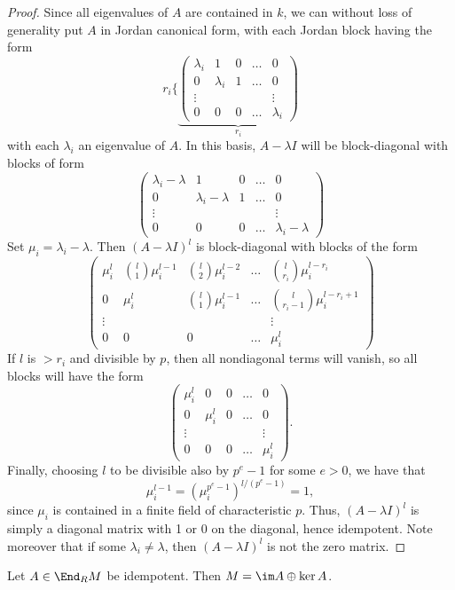 \documentclass{article}
\let\l\lambda
\numberwithin{equation}{section}
\theoremstyle{theorem}
\numberwithin{thm}{section}
\theoremstyle{definition}
\begin{document}
\begin{proof}
Since all eigenvalues of $A$ are contained in $k$, we can without loss of generality put $A$ in Jordan canonical form, with each Jordan block having the form
$$
r_i\Biggl\{
\underbrace{\begin{pmatrix}
\l_i & 1 & 0 &\dots & 0
\\
0& \l_i & 1  &\dots & 0
\\
\vdots & &&&\vdots
\\
0& 0 & 0  &\dots & \l_i
\end{pmatrix}}_{r_i}
$$
with each $\l_i$ an eigenvalue of $A$.
In this basis, $A-\l I$ will be block-diagonal with blocks of form
$$
\begin{pmatrix}
\l_i-\l & 1 & 0 &\dots & 0
\\
0& \l_i-\l & 1  &\dots & 0
\\
\vdots & &&&\vdots
\\
0& 0 & 0  &\dots & \l_i-\l
\end{pmatrix}
$$
Set $\mu_i=\l_i-\l$. Then $(A-\l I)^l$ is block-diagonal with blocks of the form
$$
\begin{pmatrix}
\mu_i^l & \binom{l}1\mu_i^{l-1} & \binom{l}2\mu_i^{l-2} &\dots & \binom{l}{r_i}\mu_i^{l-r_i}
\\
0& \mu_i^l &
\binom{l}1\mu_i^{l-1}  &\dots & \binom{l}{r_i-1}\mu_i^{l-r_i+1}
\\
\vdots & &&&\vdots
\\
0& 0 & 0  &\dots & \mu_i^l
\end{pmatrix}
$$
If $l$ is $> r_i$ and divisible by $p$, then all nondiagonal terms will vanish, so all blocks will have the form
$$
\begin{pmatrix}
\mu_i^l & 0 & 0 &\dots & 0
\\
0& \mu_i^l & 0  &\dots & 0
\\
\vdots & &&&\vdots
\\
0& 0 & 0  &\dots & \mu_i^l 
\end{pmatrix}.
$$
Finally, choosing $l$ to be divisible also by $p^e-1$ for some $e>0$, we have that $$\mu_i^{l-1} = (\mu_i^{p^{e}-1})^{l/(p^{e}-1)} =1,$$ since $\mu_i$ is contained in a finite field of characteristic $p$.
Thus, $(A-\l I)^l$ is simply a diagonal matrix with 1 or 0 on the diagonal, hence idempotent. Note moreover that if some $\l_i\neq \l$, then $(A-\l I)^l$ is not the zero matrix.

\end{proof}


\begin{lem}
Let $A\in \End_R M$ be idempotent. Then $M=\im  A\oplus \ker A$.
\end{lem}
\end{document}
